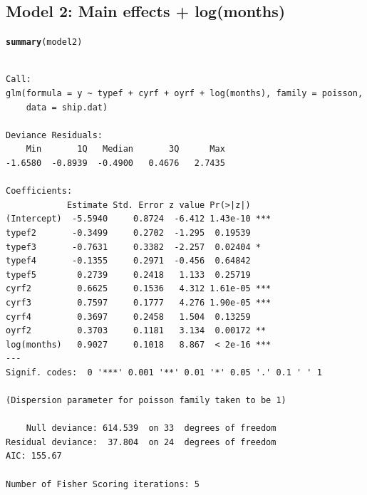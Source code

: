 \documentclass{article}\usepackage[]{graphicx}\usepackage[svgnames]{xcolor}
\makeatletter
\newcommand{\hlstd}[1]{\textcolor[rgb]{0.345,0.345,0.345}{#1}}%
\newcommand{\hlkwd}[1]{\textcolor[rgb]{0.737,0.353,0.396}{\textbf{#1}}}%
\newenvironment{kframe}{%
 \def\at@end@of@kframe{}%
 \ifinner\ifhmode%
  \def\at@end@of@kframe{\end{minipage}}%
  \begin{minipage}{\columnwidth}%
 \fi\fi%
 \def\FrameCommand##1{\hskip\@totalleftmargin \hskip-\fboxsep
 \colorbox{shadecolor}{##1}\hskip-\fboxsep
     \hskip-\linewidth \hskip-\@totalleftmargin \hskip\columnwidth}%
 \MakeFramed {\advance\hsize-\width
   \@totalleftmargin\z@ \linewidth\hsize
   \@setminipage}}%
 {\par\unskip\endMakeFramed%
 \at@end@of@kframe}
\newenvironment{knitrout}{}{} %
\makeatother
\begin{document}
\subsection*{Model 2: Main effects + log(months)}
\begin{knitrout}
\color{fgcolor}\begin{kframe}
\begin{alltt}
\hlkwd{summary}\hlstd{(model2)}
\end{alltt}
\begin{verbatim}

Call:
glm(formula = y ~ typef + cyrf + oyrf + log(months), family = poisson, 
    data = ship.dat)

Deviance Residuals: 
    Min       1Q   Median       3Q      Max  
-1.6580  -0.8939  -0.4900   0.4676   2.7435  

Coefficients:
            Estimate Std. Error z value Pr(>|z|)    
(Intercept)  -5.5940     0.8724  -6.412 1.43e-10 ***
typef2       -0.3499     0.2702  -1.295  0.19539    
typef3       -0.7631     0.3382  -2.257  0.02404 *  
typef4       -0.1355     0.2971  -0.456  0.64842    
typef5        0.2739     0.2418   1.133  0.25719    
cyrf2         0.6625     0.1536   4.312 1.61e-05 ***
cyrf3         0.7597     0.1777   4.276 1.90e-05 ***
cyrf4         0.3697     0.2458   1.504  0.13259    
oyrf2         0.3703     0.1181   3.134  0.00172 ** 
log(months)   0.9027     0.1018   8.867  < 2e-16 ***
---
Signif. codes:  0 '***' 0.001 '**' 0.01 '*' 0.05 '.' 0.1 ' ' 1

(Dispersion parameter for poisson family taken to be 1)

    Null deviance: 614.539  on 33  degrees of freedom
Residual deviance:  37.804  on 24  degrees of freedom
AIC: 155.67

Number of Fisher Scoring iterations: 5
\end{verbatim}
\end{kframe}
\end{knitrout}
\end{document}
